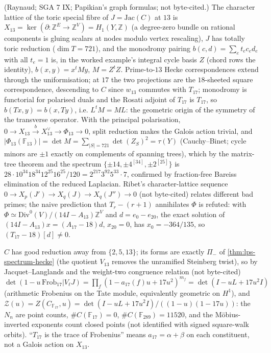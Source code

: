 \begin{theorem}
\label{thm:monodromy-pairing-cycle-metric}
(Raynaud; SGA 7 IX; Papikian's graph formulas; not byte-cited.) The character lattice of the toric special fibre of $J = \mathrm{Jac}(C)$
at $13$ is $X_{13} = \ker(\partial:\mathbb Z^E\to\mathbb Z^V) = H_1(Y,\mathbb Z)$ (a degree-zero bundle on rational components is gluing scalars at nodes
modulo vertex rescaling), $J$ has totally toric reduction ($\dim T = 721$), and the monodromy pairing $b(c,d) = \sum_et_ec_ed_e$ with all
$t_e = 1$ is, in the worked example's integral cycle basis $Z$ (chord rows the identity), $b(x,y) = x^{t}My$, $M = Z^{t}Z$. Prime-to-$13$
Hecke correspondences extend through the uniformisation; at $17$ the two projections are the $18$-sheeted square correspondence,
descending to $C$ since $w_{13}$ commutes with $T_{17}$; monodromy is functorial for polarised duals and the Rosati adjoint of $T_{17}$
is $T_{17}$, so $b(Tx,y) = b(x,Ty)$, i.e. $L^{t}M = ML$: the geometric origin of the symmetry of the transverse operator. With the
principal polarisation, $0\to X_{13}\xrightarrow{b}X_{13}^\vee\to\Phi_{13}\to0$, split reduction makes the Galois action trivial, and
$|\Phi_{13}(\mathbb F_{13})| = \det M = \sum_{|S| = 721}\det(Z_S)^2 = \tau(Y)$ (Cauchy--Binet; cycle minors are $\pm1$ exactly on complements of spanning
trees), which by the matrix-tree theorem and the spectrum $\{\pm14,\pm4^{[34]},\pm2^{[25]}\}$ is
$28\cdot10^{34}18^{34}12^{25}16^{25}/120 = 2^{217}3^{92}5^{33}\cdot7$, confirmed by fraction-free Bareiss elimination of the reduced Laplacian.
Ribet's character-lattice sequence $0\to X_p(J')\to X_q(J)\to X_q(J'')\to0$ (not byte-cited) relates different bad primes; the
naive prediction that $T_r-(r+1)$ annihilates $\Phi$ is refuted: with $\Phi\simeq\mathrm{Div}^0(V)/(14I-A_{13})\mathbb Z^V$ and $d = e_0-e_{20}$, the
exact solution of $(14I-A_{13})x = (A_{17}-18)d$, $x_{20} = 0$, has $x_0 = -364/135$, so $(T_{17}-18)[d]\ne0$.
\end{theorem}

\begin{theorem}
\label{thm:whole-curve-zeta}
$C$ has good reduction away from $\{2,5,13\}$; its forms are exactly $\Pi_-$ of \cref{thm:lps-spectrum-hecke} (the quotient $V_{13}$ removes
the unramified Steinberg twist), so by Jacquet--Langlands and the weight-two congruence relation (not byte-cited)
$\det(1-u\,\mathrm{Frob}_{17}|V_\ell J) = \prod_f(1-a_{17}(f)u+17u^2)^{m_f} = \det(I-uL+17u^2I)$ (arithmetic Frobenius on the Tate module,
equivalently geometric on $H^1$), and $\mathcal Z(u) = Z(C_{\mathbb F_{17}},u) = \det(I-uL+17u^2I)/((1-u)(1-17u))$: the $N_n$ are point counts,
$\#C(\mathbb F_{17}) = 0$, $\#C(\mathbb F_{289}) = 11520$, and the M\"obius-inverted exponents count closed points (not identified with signed
square-walk orbits). ``$T_{17}$ is the trace of Frobenius'' means $a_{17} = \alpha+\beta$ on each constituent, not a Galois action on $X_{13}$.
\end{theorem}

